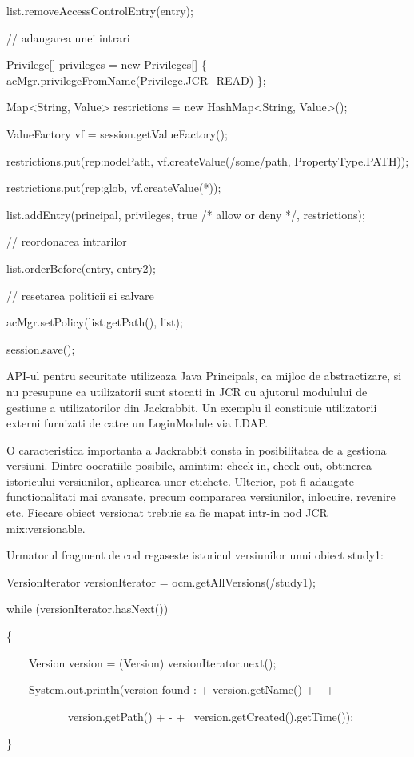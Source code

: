 \bigskip

list.removeAccessControlEntry(entry);


\bigskip

// adaugarea unei intrari

Privilege[] privileges = new Privileges[] \{ acMgr.privilegeFromName(Privilege.JCR\_READ) \};

Map{\textless}String, Value{\textgreater} restrictions = new HashMap{\textless}String, Value{\textgreater}();

ValueFactory vf = session.getValueFactory();

restrictions.put({\textquotedbl}rep:nodePath{\textquotedbl}, vf.createValue({\textquotedbl}/some/path{\textquotedbl}, PropertyType.PATH));

restrictions.put({\textquotedbl}rep:glob{\textquotedbl}, vf.createValue({\textquotedbl}*{\textquotedbl}));

list.addEntry(principal, privileges, true /* allow or deny */, restrictions);


\bigskip

// reordonarea intrarilor

list.orderBefore(entry, entry2);


\bigskip

// resetarea politicii si salvare

acMgr.setPolicy(list.getPath(), list);

session.save();


\bigskip

API-ul pentru securitate utilizeaza Java Principals, ca mijloc de abstractizare, si nu presupune ca utilizatorii sunt stocati in JCR cu ajutorul modulului de gestiune a utilizatorilor din Jackrabbit. Un exemplu il constituie utilizatorii externi furnizati de catre un LoginModule via LDAP.


\bigskip

O caracteristica importanta a Jackrabbit consta in posibilitatea de a gestiona versiuni. Dintre ooeratiile posibile, amintim: check-in, check-out, obtinerea istoricului versiunilor, aplicarea unor etichete. Ulterior, pot fi adaugate functionalitati mai avansate, precum compararea versiunilor, inlocuire, revenire etc. Fiecare obiect versionat trebuie sa fie mapat intr-in nod JCR mix:versionable. \ 


\bigskip

Urmatorul fragment de cod regaseste istoricul versiunilor unui obiect study1:


\bigskip

VersionIterator versionIterator = ocm.getAllVersions({\textquotedbl}/study1{\textquotedbl});

while (versionIterator.hasNext())

\{

\ \ \ \ Version version = (Version) versionIterator.next();

\ \ \ \ System.out.println({\textquotedbl}version found : {\textquotedbl}+ version.getName() + {\textquotedbl} - {\textquotedbl} +

\ \ \ \ \ \ \ \ \ \ \ version.getPath() + {\textquotedbl} - {\textquotedbl} + \ version.getCreated().getTime());

\}

